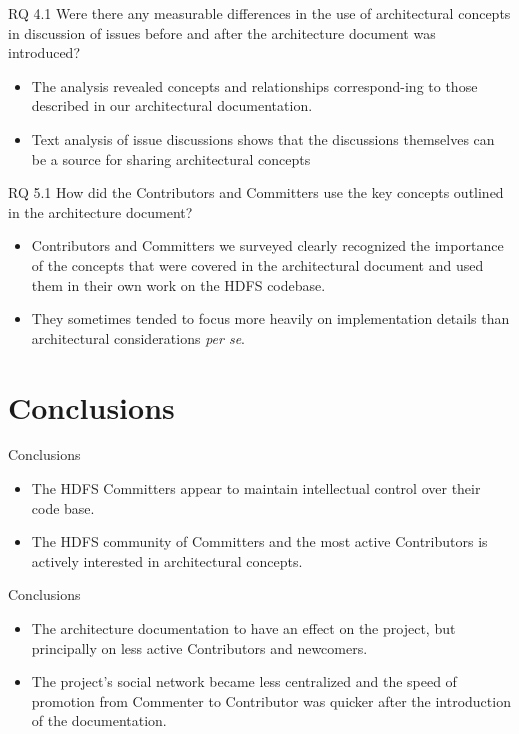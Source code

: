 \documentclass[t,14pt,mathserif]{beamer}
\begin{document}
\begin{frame}{RQ 4.1 Were there any measurable differences in the use of architectural concepts in discussion of issues before and after the architecture document was introduced?}
	
		\begin{itemize}
			\item The analysis revealed concepts and relationships correspond-ing to those described in our architectural documentation.
			\item Text analysis of issue discussions shows that the discussions themselves can be a source for sharing architectural concepts	
		\end{itemize}
	
\end{frame}





\begin{frame}{RQ 5.1 How did the Contributors and Committers use the key concepts outlined in the architecture document?}
	\begin{itemize}
		\item Contributors and Committers we surveyed clearly recognized the importance of the concepts that were covered in the architectural document and used them in their own work on the HDFS codebase.
		\item They sometimes tended to focus more heavily on implementation details than architectural considerations \textit{per se}.		
	\end{itemize}
	
\end{frame}


\section{Conclusions}
\begin{frame}{Conclusions}
	\begin{itemize}
		\item The HDFS Committers appear to maintain intellectual control over their code base.
		\item The HDFS community of Committers and the most active Contributors is actively interested in architectural concepts.
	\end{itemize}
	
\end{frame}

\begin{frame}{Conclusions}
	\begin{itemize}
		\item The architecture documentation  to have an effect on the project, but principally on less active Contributors and newcomers.
		\item The project's social network became less centralized and the speed of promotion from Commenter to Contributor was quicker after the introduction of the documentation.
	\end{itemize}
	
\end{frame}
\end{document}
